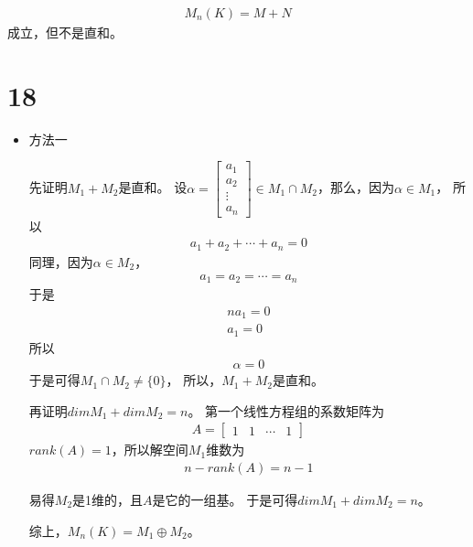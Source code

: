 \documentclass{article}
\begin{document}
\begin{align*}
  M_n(K) = M + N
\end{align*}
成立，但不是直和。

\section*{18}

\begin{itemize}
  \item 方法一

        先证明$M_1 + M_2$是直和。
        设$\alpha = \begin{bmatrix}
            a_1    \\
            a_2    \\
            \vdots \\
            a_n
          \end{bmatrix} \in M_1 \cap M_2$，那么，因为$\alpha \in M_1$，
        所以
        \begin{align*}
          a_1 + a_2 + \cdots + a_n = 0
        \end{align*}
        同理，因为$\alpha \in M_2$，
        \begin{align*}
          a_1 = a_2 = \cdots = a_n
        \end{align*}
        于是
        \begin{align*}
          n a_1 = 0 \\
          a_1 = 0
        \end{align*}
        所以
        \begin{align*}
          \alpha = 0
        \end{align*}
        于是可得$M_1 \cap M_2 \neq \{0\}$，
        所以，$M_1 + M_2$是直和。

        再证明$dim M_1 + dim M_2 = n$。
        第一个线性方程组的系数矩阵为
        \begin{align*}
          A = \begin{bmatrix}
                1 & 1 & \cdots & 1
              \end{bmatrix}
        \end{align*}
        $rank(A) = 1$，所以解空间$M_1$维数为
        \begin{align*}
          n - rank(A) = n - 1
        \end{align*}

        易得$M_2$是1维的，且$A$是它的一组基。
        于是可得$dim M_1 + dim M_2 = n$。

        综上，$M_n(K) = M_1 \oplus M_2$。


\end{itemize}
\end{document}
